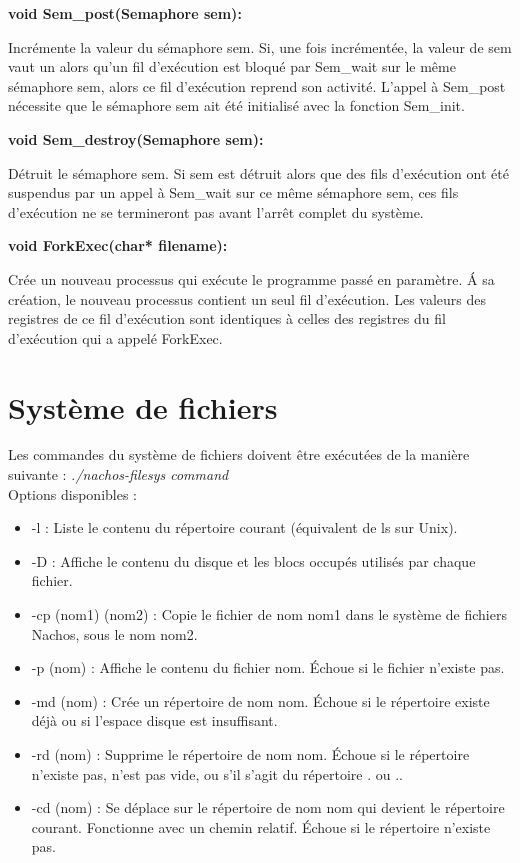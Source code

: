 \documentclass[12pt]{report}
\begin{document}
\textbf{void Sem\_post(Semaphore sem):}

Incrémente la valeur du sémaphore sem. Si, une fois incrémentée, la valeur de sem vaut un alors qu'un fil d'exécution est bloqué par Sem\_wait sur le même sémaphore sem, alors ce fil d'exécution reprend son activité.
L'appel à Sem\_post nécessite que le sémaphore sem ait été initialisé avec la fonction Sem\_init.
\bigskip


\textbf{void Sem\_destroy(Semaphore sem):}

Détruit le sémaphore sem. Si sem est détruit alors que des fils d'exécution ont été suspendus par un appel à Sem\_wait sur ce même sémaphore sem, ces fils d'exécution ne se termineront pas avant l'arrêt complet du système.
\bigskip


\textbf{void ForkExec(char* filename):}

Crée un nouveau processus qui exécute le programme passé en paramètre. \'A sa création, le nouveau processus contient un seul fil d'exécution. Les valeurs des registres de ce fil d'exécution sont identiques à celles des registres du fil d'exécution qui a appelé ForkExec.
\bigskip


\section{Système de fichiers}

Les commandes du système de fichiers doivent être exécutées de la manière suivante :
\textit{./nachos-filesys command}\\

Options disponibles :\\
\begin{itemize}\renewcommand{\labelitemi}{$\bullet$}
\item -l  : Liste le contenu du répertoire courant (équivalent de ls sur Unix).
\item  -D  : Affiche le contenu du disque et les blocs occupés utilisés par chaque fichier.
\item  -cp (nom1) (nom2) : Copie le fichier de nom nom1 dans le système de fichiers Nachos, sous le nom nom2.
\item  -p (nom) : Affiche le contenu du fichier nom. Échoue si le fichier n'existe pas.
\item  -md (nom) : Crée un répertoire de nom nom. Échoue si le répertoire existe déjà ou si l'espace disque est insuffisant.
\item  -rd (nom) : Supprime le répertoire de nom nom. Échoue si le répertoire n'existe pas, n'est pas vide, ou s'il s'agit du répertoire . ou ..
\item -cd (nom) : Se déplace sur le répertoire de nom nom qui devient le répertoire courant. Fonctionne avec un chemin relatif. Échoue si le répertoire n'existe pas.
\end{itemize}
\end{document}
